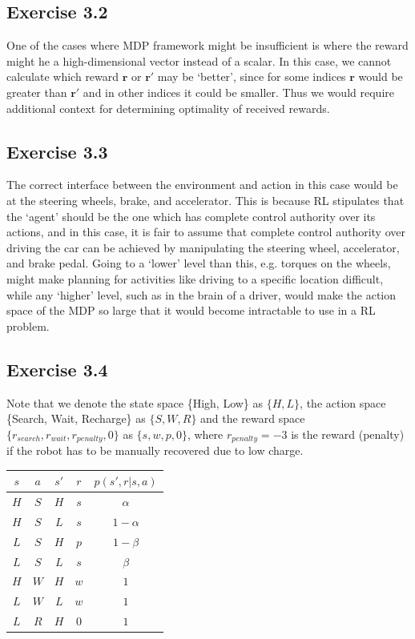 \documentclass[10pt]{article}
\begin{document}
	\subsection*{Exercise 3.2}
	\label{ss:3.2}
	One of the cases where MDP framework might be insufficient is where the reward might he a high-dimensional vector instead of a scalar. In this case, we cannot calculate which reward $\mathbf{r}$ or $\mathbf{r}'$ may be `better', since for some indices $\mathbf{r}$ would be greater than $\mathbf{r}'$ and in other indices it could be smaller. Thus we would require additional context for determining optimality of received rewards. 
	\subsection*{Exercise 3.3}
	\label{ss:3.3}
	The correct interface between the environment and action in this case would be at the steering wheels, brake, and accelerator. This is because RL stipulates that the `agent' should be the one which has complete control authority over its actions, and in this case, it is fair to assume that complete control authority over driving the car can be achieved by manipulating the steering wheel, accelerator, and brake pedal. Going to a `lower' level than this, e.g. torques on the wheels, might make planning  for activities like driving to a specific location difficult, while any `higher' level, such as in the brain of a driver, would make the action space of the MDP so large that it would become intractable to use in a RL problem.
	\subsection*{Exercise 3.4}
	\label{ss:3.4}
	Note that we denote the state space \{High, Low\} as $\{H,L\}$, the action space \{Search, Wait, Recharge\} as $\{S,W,R\}$ and the reward space $\{r_{search},r_{wait},r_{penalty},0\}$ as $\{s,w,p,0\}$, where $r_{penalty}=-3$ is the reward (penalty) if the robot has to be manually recovered due to low charge.
	\begin{center}
	\begin{tabular}[H]{|c|c|c|c|c|}
		\hline
		$s$ & $a$ & $s'$ & $r$ & $p(s',r | s,a)$\\
		\hline\hline
		$H$ & $S$ & $H$ & $s$ & $\alpha$\\
		\hline
		$H$ & $S$ & $L$ & $s$ & $1-\alpha$\\
		\hline
		$L$ & $S$ & $H$ & $p$ & $1-\beta$\\
		\hline
		$L$ & $S$ & $L$ & $s$ & $\beta$ \\
		\hline
		$H$ & $W$ & $H$ & $w$ & $1$\\
		\hline
		$L$ & $W$ & $L$ & $w$ & $1$\\
		\hline
		$L$ & $R$ & $H$ & $0$ & $1$\\
		\hline
	\end{tabular}
	\end{center}
\end{document}
